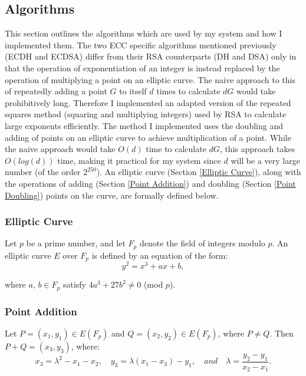 \documentclass[12pt,a4paper]{article}
\begin{document}
\subsection{Algorithms} \noindent \label{Algorithms}
This section outlines the algorithms which are used by my system and how I implemented them. 
The two ECC specific algorithms mentioned previously (ECDH and ECDSA) differ from their RSA counterparts (DH and DSA) only in that 
the operation of exponentiation of an integer is instead replaced by the operation of multiplying a point on an elliptic curve. 
The naive approach to this of repeatedly adding a point $G$ to itself $d$ times to calculate $dG$ would take prohibitively long. 
Therefore I implemented an adapted version of the repeated squares method (squaring and multiplying integers) 
used by RSA to calculate large exponents efficiently. 
The method I implemented uses the doubling and adding of points on an elliptic curve to achieve multiplication of a point. 
While the naive approach would take $O(d)$ time to calculate $dG$, this approach takes $O(log(d))$ time, 
making it practical for my system since $d$ will be a very large number (of the order $2^{250}$). 
An elliptic curve (Section \ref{Elliptic Curve}), along with the operations of adding (Section \ref{Point Addition}) 
and doubling (Section \ref{Point Doubling}) points on the curve, are formally defined below. 

\subsubsection{Elliptic Curve} \noindent \label{Elliptic Curve}
Let $p$ be a prime number, and let $F_p$ denote the field of integers modulo $p$. 
An elliptic curve $E$ over $F_p$ is defined by an equation of the form:
\begin{equation}
y^2 = x^3 + ax + b,
\end{equation}

where $a,\, b \in F_p$ satisfy $4a^3 + 27b^2 \ne 0$ (mod $ p$).

\subsubsection{Point Addition} \noindent \label{Point Addition}
Let $P = (x_1,y_1) \in E(F_p)$ and $Q = (x_2,y_2) \in E(F_p)$, where $P \neq Q$. 
Then $P + Q = (x_3,y_3)$, where:
\begin{equation}
    x_3 = \lambda^2 - x_1 - x_2, \quad y_3 = \lambda(x_1 - x_3) - y_1, \quad and \quad \lambda = \frac{y_2-y_1}{x_2-x_1}.
\end{equation}
\end{document}
